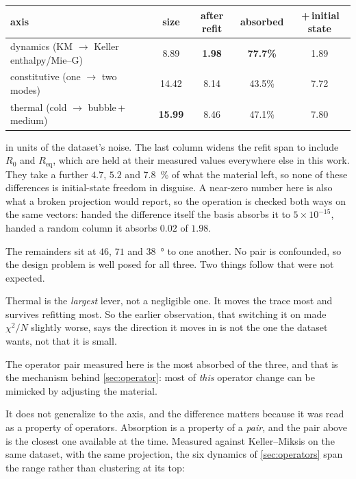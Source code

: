 \documentclass[10pt]{article}
\begin{document}
\begin{center}
\begin{tabular}{lcccc}
\toprule
axis & size & after refit & absorbed & \,+\,initial state \\
\midrule
dynamics (KM $\to$ Keller enthalpy/Mie--G) & 8.89 & \textbf{1.98} & \textbf{77.7\%} & 1.89 \\
constitutive (one $\to$ two modes) & 14.42 & 8.14 & 43.5\% & 7.72 \\
thermal (cold $\to$ bubble\,+\,medium) & \textbf{15.99} & 8.46 & 47.1\% & 7.80 \\
\bottomrule
\end{tabular}
\end{center}

\noindent in units of the dataset's noise. The last column widens the refit span to include
$R_0$ and $R_{\mathrm{eq}}$, which are held at their measured values everywhere else in this
work. They take a further $4.7$, $5.2$ and \SI{7.8}{\percent} of what the material left, so
none of these differences is initial-state freedom in disguise. A near-zero number here is
also what a broken projection would report, so the operation is checked both ways on the same
vectors: handed the difference itself the basis absorbs it to $5\times10^{-15}$, handed a
random column it absorbs $0.02$ of $1.98$.

The remainders sit at $46$, $71$ and \SI{38}{\degree} to one another. No pair is confounded,
so the design problem is well posed for all three. Two things follow that were not expected.

Thermal is the \emph{largest} lever, not a negligible one. It moves the trace most and
survives refitting most. So the earlier observation, that switching it on made $\chi^2/N$
slightly worse, says the direction it moves in is not the one the dataset wants, not that it
is small.

The operator pair measured here is the most absorbed of the three, and that is the mechanism
behind \cref{sec:operator}: most of \emph{this} operator change can be mimicked by adjusting
the material.

It does not generalize to the axis, and the difference matters because it was read as a
property of operators. Absorption is a property of a \emph{pair}, and the pair above is the
closest one available at the time. Measured against Keller--Miksis on the same dataset, with the
same projection, the six dynamics of \cref{sec:operators} span the range rather than clustering
at its top:
\end{document}
